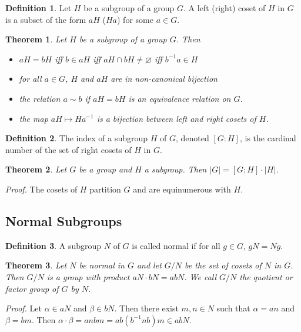 \documentclass[12pt, reqno]{article}
\theoremstyle{plain}
\newtheorem{theorem}{Theorem}[section]
\theoremstyle{definition}
\newtheorem*{definition}{Definition}
\theoremstyle{remark}
\renewcommand{\emptyset}{\varnothing}
\begin{document}
\begin{definition}
    Let $H$ be a subgroup of a group $G$. A left (right) coset of $H$ in $G$ is a subset of the form 
    $aH$ ($Ha$) for some $a \in G$. 
\end{definition}

\begin{theorem}
    Let $H$ be a subgroup of a group $G$. Then
    \begin{itemize}
        \item $aH = bH$ iff $b \in aH$ iff $aH \cap bH \neq \emptyset$ iff $b^{-1}a \in H$
        \item for all $a \in G$, $H$ and $aH$ are in non-canonical bijection
        \item the relation $a \sim b$ if $aH = bH$ is an equivalence relation on $G$.
        \item the map $aH \mapsto Ha^{-1}$ is a bijection between left and right cosets of $H$.
    \end{itemize}
\end{theorem}

\begin{definition}
    The index of a subgroup $H$ of $G$, denoted $[G:H]$, is the cardinal number of the set of right cosets of $H$
    in $G$. 
\end{definition}

\begin{theorem}
    Let $G$ be a group and $H$ a subgroup. Then $|G| = [G:H]\cdot |H|$.
\end{theorem}

\textit{Proof.} The cosets of $H$ partition $G$ and are equinumerous with $H$.

\subsection*{Normal Subgroups}

\begin{definition}
    A subgroup $N$ of $G$ is called normal if for all $g \in G$, $gN = Ng$. 
\end{definition}

\begin{theorem}
    Let $N$ be normal in $G$ and let $G/N$ be the set of cosets of $N$ in $G$. Then $G/N$ is a group 
    with product $aN \cdot bN = abN$. We call $G/N$ the quotient or factor group of $G$ by $N$.
\end{theorem}

\textit{Proof.} Let $\alpha \in aN$ and $\beta \in bN$. Then there exist $m,n \in N$ such that $\alpha = an$
and $\beta = bm$. Then $\alpha \cdot \beta = anbm = ab(b^{-1}nb)m \in ab N$. 
\end{document}
